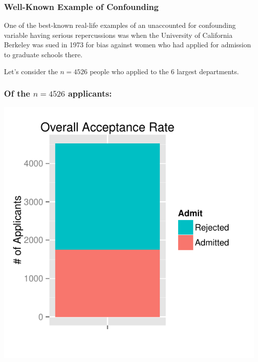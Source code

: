 \documentclass[slides]{beamer}\usepackage[]{graphicx}\usepackage[]{color}
\begin{document}
\begin{frame}
\frametitle{Well-Known Example of Confounding}

One of the best-known real-life examples of an unaccounted for confounding variable having serious repercussions was when the University of California Berkeley was sued in 1973 for bias against women who had applied for admission to graduate schools there. 

\vskip 0.5cm

\pause Let's consider the $n=4526$ people who applied to the 6 largest departments.

\end{frame}



\begin{frame}
\frametitle{Of the $n=4526$ applicants:}

\begin{center}
\includegraphics[height=\textheight]{overall.pdf}
\end{center}

\end{frame}
\end{document}
